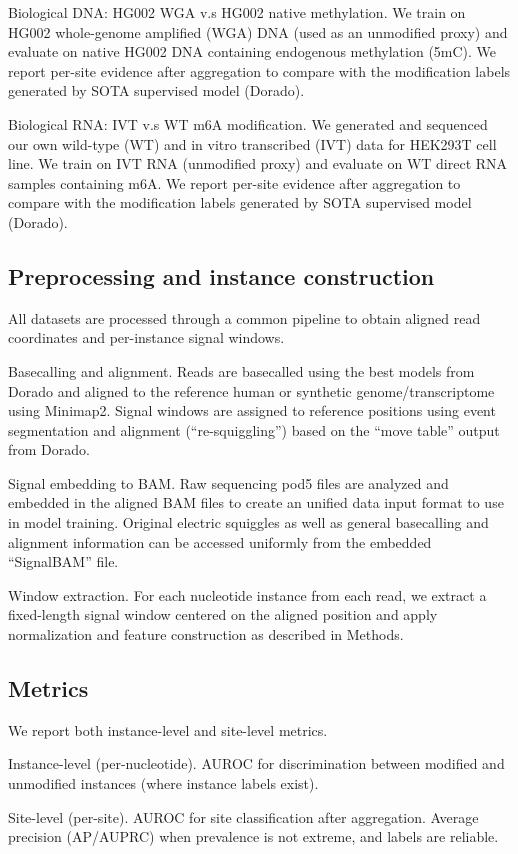 \documentclass[journal,article,submit,pdftex,moreauthors]{Definitions/mdpi}
\begin{document}
Biological DNA: HG002 WGA v.s HG002 native methylation. We train on HG002 whole-genome amplified (WGA) DNA (used as an unmodified proxy) and evaluate on native HG002 DNA containing endogenous methylation (5mC). We report per-site evidence after aggregation to compare with the modification labels generated by SOTA supervised model (Dorado).

Biological RNA: IVT v.s WT m6A modification. We generated and sequenced our own wild-type (WT) and in vitro transcribed (IVT) data for HEK293T cell line. We train on IVT RNA (unmodified proxy) and evaluate on WT direct RNA samples containing m6A. We report per-site evidence after aggregation to compare with the modification labels generated by SOTA supervised model (Dorado).

\subsection{Preprocessing and instance construction}
All datasets are processed through a common pipeline to obtain aligned read coordinates and per-instance signal windows.

Basecalling and alignment. Reads are basecalled using the best models from Dorado and aligned to the reference human or synthetic genome/transcriptome using Minimap2. Signal windows are assigned to reference positions using event segmentation and alignment (“re-squiggling”) based on the “move table” output from Dorado.

Signal embedding to BAM. Raw sequencing pod5 files are analyzed and embedded in the aligned BAM files to create an unified data input format to use in model training. Original electric squiggles as well as general basecalling and alignment information can be accessed uniformly from the embedded “SignalBAM” file.

Window extraction. For each nucleotide instance from each read, we extract a fixed-length signal window centered on the aligned position and apply normalization and feature construction as described in Methods.

\subsection{Metrics}
We report both instance-level and site-level metrics.

Instance-level (per-nucleotide). AUROC for discrimination between modified and unmodified instances (where instance labels exist).

Site-level (per-site). AUROC for site classification after aggregation. Average precision (AP/AUPRC) when prevalence is not extreme, and labels are reliable.
\end{document}
